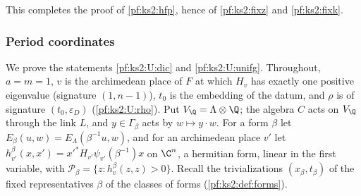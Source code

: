 This completes the proof of \cref{pf:ks2:hfp}, hence of \cref{pf:ks2:fixz} and \cref{pf:ks2:fixk}.

\subsubsection{Period coordinates}\label{pf:ks2:sec:coord}

We prove the statements \ref{pf:ks2:U:dic} and \ref{pf:ks2:U:unifg}. Throughout, $a=m=1$, $v$ is the
archimedean place of $F$ at which $H_v$ has exactly one positive eigenvalue (signature $(1,n-1)$),
$t_0$ is the embedding of the datum, and $\rho$ is of signature $(t_0,\varepsilon_D)$
(\ref{pf:ks2:U:rho}). Put $V_\Q=\Lambda\otimes\Q$; the algebra $C$ acts on $V_\Q$ through the link
$L$, and $y\in\Gamma_\beta$ acts by $w\mapsto y\cdot w$. For a form $\beta$ let
$E_\beta(u,w)=E_\Lambda(\beta^{-1}u,w)$, and for an archimedean place $v'$ let $h^\beta_{v'}(x,x')=
x'^*H_{v'}\psi_{v'}(\beta^{-1})x$ on $\C^n$, a hermitian form, linear in the first variable, with
$\mathcal P_\beta=\{z:h^\beta_v(z,z)>0\}$. Recall the trivializations $(x_\beta,t_\beta)$ of the fixed
representatives $\beta$ of the classes of forms (\cref{pf:ks2:def:forms}).

